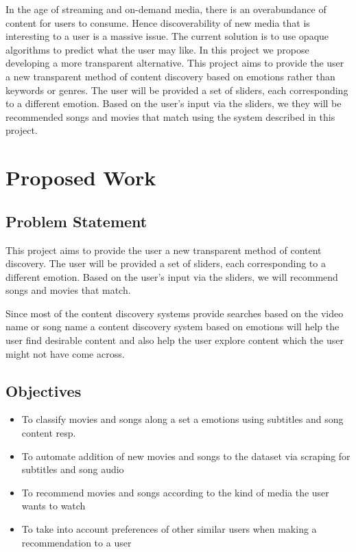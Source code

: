 \documentclass[12pt]{report}
\begin{document}


\clearpage


	\vspace{2cm}
	\justifying\small{In the age of streaming and on-demand media, there is an overabundance of content for users to consume. Hence discoverability of new media that is interesting to a user is a massive issue. The current solution is to use opaque algorithms to predict what the user may like. In this project we propose developing a more transparent alternative. This project aims to provide the user a new transparent method of content discovery based on emotions rather than keywords or genres. The user will be provided a set of sliders, each corresponding to a different emotion. Based on the user’s input via the sliders, we they will be recommended songs and movies that match using the system described in this project. } \cite{bert}
\clearpage
\tableofcontents
\listoffigures






\chapter{Proposed Work}
\section{Problem Statement}
This project aims to provide the user a new transparent method of content discovery. The user will be provided a set of sliders, each corresponding to a different emotion. Based on the user’s input via the sliders, we will recommend songs and movies that match. \newline

Since most of the content discovery systems provide searches based on the video name or song name a content discovery system based on emotions will help the user find desirable content and also help the user explore content which the user might not have come across.

\section{Objectives}
\begin{itemize}
	\item To classify movies and songs along a set a emotions using subtitles and song content resp.
	\item To automate addition of new movies and songs to the dataset via scraping for subtitles and song audio
	\item To recommend movies and songs according to the kind of media the user wants to watch
	\item To take into account preferences of other similar users when making a recommendation to a user
\end{itemize}

\end{document}
